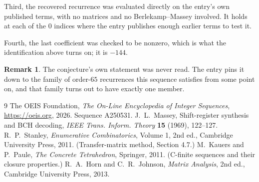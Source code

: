 \documentclass[11pt,a4paper]{article}
\theoremstyle{plain}
\theoremstyle{definition}
\newtheorem{remark}[theorem]{Remark}
\begin{document}
Third, the recovered recurrence was evaluated directly on the entry's own published terms, with
no matrices and no Berlekamp--Massey involved. It holds at each of the $0$ indices where
the entry publishes enough earlier terms to test it.

Fourth, the last coefficient was checked to be nonzero, which is what the identification above
turns on; it is $-144$.

\begin{remark}
The conjecture's own statement was never read. The entry pins it down to the family of
order-$65$ recurrences this sequence satisfies from some point on, and that family turns
out to have exactly one member.
\end{remark}

\begin{thebibliography}{9}
 The OEIS Foundation, \emph{The On-Line Encyclopedia of Integer
Sequences}, \url{https://oeis.org}, 2026. Sequence A250531.
 J.~L.~Massey, Shift-register synthesis and BCH decoding, \emph{IEEE
Trans. Inform. Theory} \textbf{15} (1969), 122--127.
 R.~P.~Stanley, \emph{Enumerative Combinatorics}, Volume 1, 2nd ed.,
Cambridge University Press, 2011. (Transfer-matrix method, Section 4.7.)
 M.~Kauers and P.~Paule, \emph{The Concrete Tetrahedron}, Springer, 2011.
(C-finite sequences and their closure properties.)
 R.~A.~Horn and C.~R.~Johnson, \emph{Matrix Analysis}, 2nd ed., Cambridge
University Press, 2013.
\end{thebibliography}
\end{document}
